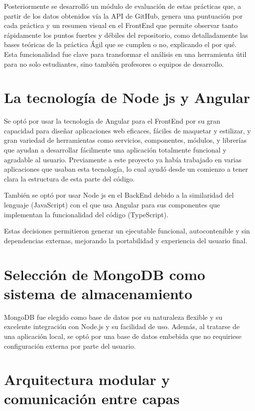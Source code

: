Posteriormente se desarrolló un módulo de evaluación de estas prácticas que, a partir de los datos obtenidos vía la API de GitHub, genera una puntuación por cada práctica y un resumen visual en el FrontEnd que permite observar tanto rápidamente los puntos fuertes y débiles del repositorio, como detalladamente las bases teóricas de la práctica Ágil que se cumplen o no, explicando el por qué. Esta funcionalidad fue clave para transformar el análisis en una herramienta útil para no solo estudiantes, sino también profesores o equipos de desarrollo.

\section{La tecnología de Node js y Angular} Se optó por usar la tecnología de Angular para el FrontEnd por su gran capacidad para diseñar aplicaciones web eficaces, fáciles de maquetar y estilizar, y gran variedad de herramientas como servicios, componentes, módulos, y librerías que ayudan a desarrollar fácilmente una aplicación totalmente funcional y agradable al usuario. Previamente a este proyecto ya había trabajado en varias aplicaciones que usaban esta tecnología, lo cual ayudó desde un comienzo a tener clara la estructura de esta parte del código.

También se optó por usar Node js en el BackEnd debido a la similaridad del lenguaje (JavaScript) con el que usa Angular para sus componentes que implementan la funcionalidad del código (TypeScript).

Estas decisiones permitieron generar un ejecutable funcional, autocontenible y sin dependencias externas, mejorando la portabilidad y experiencia del usuario final.

\section{Selección de MongoDB como sistema de almacenamiento}

MongoDB fue elegido como base de datos por su naturaleza flexible y su excelente integración con Node.js y su facilidad de uso. Además, al tratarse de una aplicación local, se optó por una base de datos embebida que no requiriese configuración externa por parte del usuario.

\section{Arquitectura modular y comunicación entre capas}

